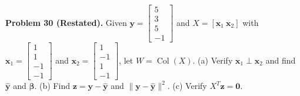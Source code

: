 \documentclass[11pt, letterpaper]{article}
\theoremstyle{definition}
\theoremstyle{remark}
\begin{document}
\medskip
\textbf{Problem 30 (Restated).} Given $\mathbf{y} = \begin{bmatrix} 5 \\ 3 \\ 5 \\ -1 \end{bmatrix}$ and $X = [\mathbf{x}_1 \ \mathbf{x}_2]$ with $\mathbf{x}_1 = \begin{bmatrix} 1 \\ 1 \\ -1 \\ -1 \end{bmatrix}$ and $\mathbf{x}_2 = \begin{bmatrix} 1 \\ -1 \\ 1 \\ -1 \end{bmatrix}$, let $W = \operatorname{Col}(X)$. (a) Verify $\mathbf{x}_1 \perp \mathbf{x}_2$ and find $\hat{\mathbf{y}}$ and $\boldsymbol{\beta}$. (b) Find $\mathbf{z} = \mathbf{y} - \hat{\mathbf{y}}$ and $\|\mathbf{y} - \hat{\mathbf{y}}\|^2$. (c) Verify $X^T \mathbf{z} = \mathbf{0}$.
\end{document}
